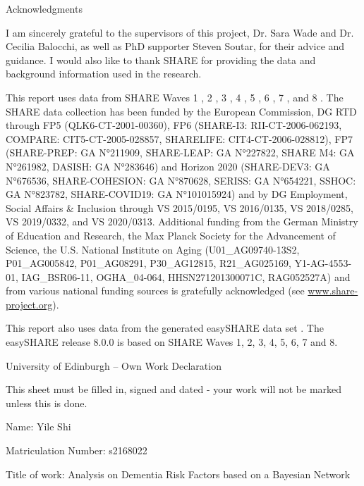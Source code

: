 \documentclass[11pt,twoside]{article}
\numberwithin{Theorem}{section}
\numberwithin{Definition}{section}
\numberwithin{Lemma}{section}
\numberwithin{Algorithm}{section}
\numberwithin{equation}{section}
\begin{document}
\clearpage

\begin{center}
\Large{Acknowledgments}
\end{center}

I am sincerely grateful to the supervisors of this project, Dr. Sara Wade and Dr. Cecilia Balocchi, as well as PhD supporter Steven Soutar, for their advice and guidance. I would also like to thank SHARE for providing the data and background information used in the research. 

This report uses data from SHARE Waves 1 \cite{share1}, 2 \cite{share2}, 3 \cite{share3}, 4 \cite{share4}, 5 \cite{share5}, 6 \cite{share6}, 7 \cite{share7}, and 8 \cite{share8}. The SHARE data collection has been funded by the European Commission, DG RTD through FP5 (QLK6-CT-2001-00360), FP6 (SHARE-I3: RII-CT-2006-062193, COMPARE: CIT5-CT-2005-028857, SHARELIFE: CIT4-CT-2006-028812), FP7 (SHARE-PREP: GA N°211909, SHARE-LEAP: GA N°227822, SHARE M4: GA N°261982, DASISH: GA N°283646) and Horizon 2020 (SHARE-DEV3: GA N°676536, SHARE-COHESION: GA N°870628, SERISS: GA N°654221, SSHOC: GA N°823782, SHARE-COVID19: GA N°101015924) and by DG Employment, Social Affairs \& Inclusion through VS 2015/0195, VS 2016/0135, VS 2018/0285, VS 2019/0332, and VS 2020/0313. Additional funding from the German Ministry of Education and Research, the Max Planck Society for the Advancement of Science, the U.S. National Institute on Aging (U01\_AG09740-13S2, P01\_AG005842, P01\_AG08291, P30\_AG12815, R21\_AG025169, Y1-AG-4553-01, IAG\_BSR06-11, OGHA\_04-064, HHSN271201300071C, RAG052527A) and from various national funding sources is gratefully acknowledged (see \href{www.share-project.org}{www.share-project.org}).

This report also uses data from the generated easySHARE data set \cite{easyshare}. The easySHARE release 8.0.0 is based on SHARE Waves 1, 2, 3, 4, 5, 6, 7 and 8.

\clearpage


\begin{center}
\Large{University of Edinburgh – Own Work Declaration}
\end{center}

This sheet must be filled in, signed and dated - your work will not be marked unless this is done.
\vspace{1cm}

Name: Yile Shi

Matriculation Number: s2168022

Title of work: Analysis on Dementia Risk Factors based on a Bayesian Network
\end{document}
